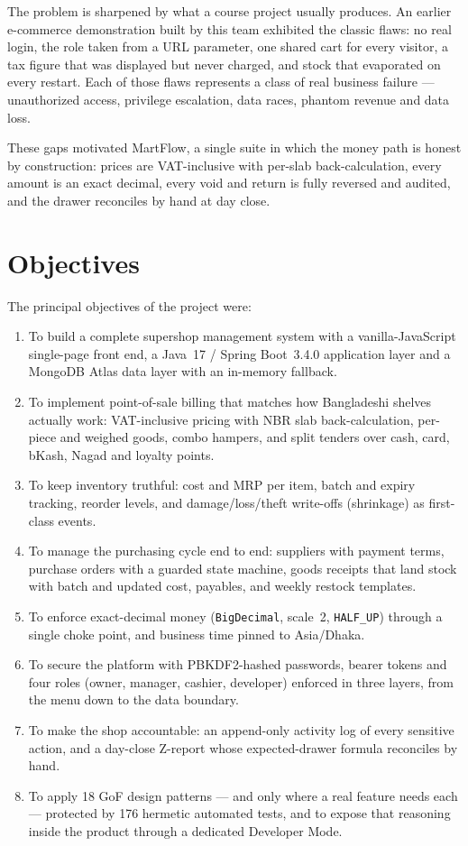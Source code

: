 \documentclass[12pt,a4paper]{report}
\begin{document}
The problem is sharpened by what a course project usually produces. An earlier e-commerce
demonstration built by this team exhibited the classic flaws: no real login, the role taken
from a URL parameter, one shared cart for every visitor, a tax figure that was displayed
but never charged, and stock that evaporated on every restart. Each of those flaws
represents a class of real business failure --- unauthorized access, privilege escalation,
data races, phantom revenue and data loss.

These gaps motivated MartFlow, a single suite in which the money path is honest by
construction: prices are VAT-inclusive with per-slab back-calculation, every amount is an
exact decimal, every void and return is fully reversed and audited, and the drawer
reconciles by hand at day close.

\section{Objectives}
The principal objectives of the project were:
\begin{enumerate}
  \item To build a complete supershop management system with a vanilla-JavaScript
        single-page front end, a Java~17 / Spring Boot~3.4.0 application layer and a
        MongoDB Atlas data layer with an in-memory fallback.
  \item To implement point-of-sale billing that matches how Bangladeshi shelves actually
        work: VAT-inclusive pricing with NBR slab back-calculation, per-piece and weighed
        goods, combo hampers, and split tenders over cash, card, bKash, Nagad and loyalty
        points.
  \item To keep inventory truthful: cost and MRP per item, batch and expiry tracking,
        reorder levels, and damage/loss/theft write-offs (shrinkage) as first-class events.
  \item To manage the purchasing cycle end to end: suppliers with payment terms, purchase
        orders with a guarded state machine, goods receipts that land stock with batch and
        updated cost, payables, and weekly restock templates.
  \item To enforce exact-decimal money (\texttt{BigDecimal}, scale~2, \texttt{HALF\_UP})
        through a single choke point, and business time pinned to Asia/Dhaka.
  \item To secure the platform with PBKDF2-hashed passwords, bearer tokens and four roles
        (owner, manager, cashier, developer) enforced in three layers, from the menu down
        to the data boundary.
  \item To make the shop accountable: an append-only activity log of every sensitive
        action, and a day-close Z-report whose expected-drawer formula reconciles by hand.
  \item To apply 18 GoF design patterns --- and only where a real feature needs each ---
        protected by 176 hermetic automated tests, and to expose that reasoning inside the
        product through a dedicated Developer Mode.
\end{enumerate}
\end{document}
